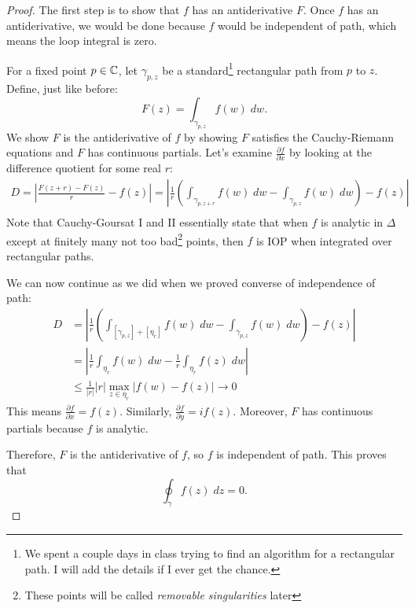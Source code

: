 \begin{proof}
    The first step is to show that $f$ has an antiderivative $F$.
    Once $f$ has an antiderivative, we would be done
    because $f$ would be independent of path, which means
    the loop integral is zero.

    \noindent
    For a fixed point $p \in \operatorname{\mathbb{C}}$, let $\gamma_{p, z}$ be a standard\footnote{We spent a couple days in class trying to
        find an algorithm for a rectangular path.
        I will add the details if I ever get the chance.
    }
    rectangular path from $p$ to $z$. 
    Define, just like before:
    \[ F(z) = \int_{\gamma_{p, z}} f(w) \; dw.\]
    We show $F$ is the antiderivative of $f$ by showing
    $F$ satisfies the Cauchy-Riemann equations and $F$ 
    has continuous partials.
    Let's examine $\frac{\partial f}{\partial x}$ by 
    looking at the difference quotient for some real $r$:
    \begin{align*}
        D = 
        \left| \frac{F(z+r) - F(z)}{r} - f(z)\right| =
        \left| \frac{1}{r}\left( \int_{\gamma_{p, z+r}} f(w) \; dw - 
        \int_{\gamma_{p, z}} f(w) \; dw \right)  - f(z) \right| \\
    \end{align*}
    Note that Cauchy-Goursat I and II essentially state that
    when $f$ is analytic in $\Delta$ except at finitely many
    not too bad\footnote{These
    points will be called \textit{removable singularities}
    later}
    points, then $f$ is IOP when integrated
    over rectangular paths.

    \noindent
    We can now continue as we did when we proved converse of 
    independence of path:
    \begin{align*}
        D &= \left| \frac{1}{r}\left( \int_{[\gamma_{p, z}] + [\eta_r]} f(w) \; dw - 
        \int_{\gamma_{p, z}} f(w) \; dw \right)  - f(z) \right| \tag{Independence of Path} \\
        &= \left| \frac{1}{r} \int_{\eta_r} f(w) \; dw - 
        \frac{1}{r} \int_{\eta_r} f(z) \; dw  \right| \tag{Concatenation of Paths} \\
        &\le \frac{1}{|r|} |r| \max_{z \in \eta_r} |f(w) - f(z)|
        \to 0 \tag{ML and Continuity of $f$}
    \end{align*}
    This means $\frac{\partial f}{\partial x} = f(z)$.
    Similarly, $\frac{\partial f}{\partial y} = if(z)$.
    Moreover, $F$ has continuous partials because $f$ is analytic.
    
    \noindent
    Therefore, $F$ is the antiderivative of $f$, so
    $f$ is independent of path.
    This proves that
    \[ \oint_{\gamma} f(z) \; dz = 0. \]
\end{proof}






